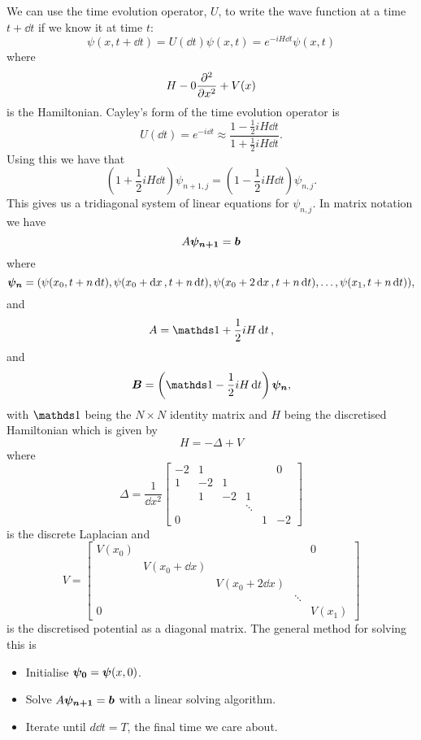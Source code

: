 \documentclass[a4paper]{article}
\begin{document}
    We can use the time evolution operator, \(U\), to write the wave function at a time \(t + \dd{t}\) if we know it at time \(t\):
    \[\psi(x, t + \dd{t}) = U(\dd{t})\psi(x, t) = e^{-iH\dd{t}}\psi(x, t)\]
    where
    \[H - 0\pdv[2]{x} + V(x)\]
    is the Hamiltonian.
    Cayley's form of the time evolution operator is
    \[U(\dd{t}) = e^{-i\dd{t}} \approx \frac{1 - \frac{1}{2}iH\dd{t}}{1 + \frac{1}{2}iH\dd{t}}.\]
    Using this we have that
    \[\left(1 + \frac{1}{2}iH\dd{t}\right)\psi_{n+1,j} = \left(1 - \frac{1}{2}iH\dd{t}\right)\psi_{n,j}.\]
    This gives us a tridiagonal system of linear equations for \(\psi_{n,j}\).
    In matrix notation we have
    \[A\bm{\psi_{n+1}} = \bm{b}\]
    where
    \[\bm{\psi_{n}} = (\psi(x_0, t + n\dd{t}), \psi(x_0 + \dd{x}, t + n\dd{t}), \psi(x_0 + 2\dd{x}, t + n\dd{t}), \dotsc, \psi(x_1, t + n\dd{t})),\]
    and
    \[A = \ident + \frac{1}{2}iH\dd{t},\]
    and
    \[\vv{B} = \left(\ident - \frac{1}{2}iH\dd{t}\right)\vv{\psi_n},\]
    with \(\ident\) being the \(N\times N\) identity matrix and \(H\) being the discretised Hamiltonian which is given by
    \[H = -\Delta + V\]
    where
    \[
        \Delta = \frac{1}{\dd{x}^2}
        \begin{bmatrix}
        	-2 & 1  &    &        &   &  0 \\
        	1  & -2 & 1  &        &   &    \\
        	   & 1  & -2 & 1      &   &    \\
        	   &    &    & \ddots &   &    \\
        	0  &    &    &        & 1 & -2
        \end{bmatrix}
    \]
    is the discrete Laplacian and
    \[
        V = 
        \begin{bmatrix}
        	V(x_0) &                 &                  &        & 0\\
        	       & V(x_0 + \dd{x}) &                  &        &  \\
        	       &                 & V(x_0 + 2\dd{x}) &        &  \\
        	       &                 &                  & \ddots &  \\
        	0      &                 &                  &        & V(x_1)
        \end{bmatrix}
    \]
    is the discretised potential as a diagonal matrix.
    The general method for solving this is
    \begin{itemize}
        \item Initialise \(\bm{\psi_0} = \bm{\psi}(x, 0)\).
        \item Solve \(A\bm{\psi_{n+1}} = \bm{b}\) with a linear solving algorithm.
        \item Iterate until \(d\dd{t} = T\), the final time we care about.
    \end{itemize}
    
\end{document}
